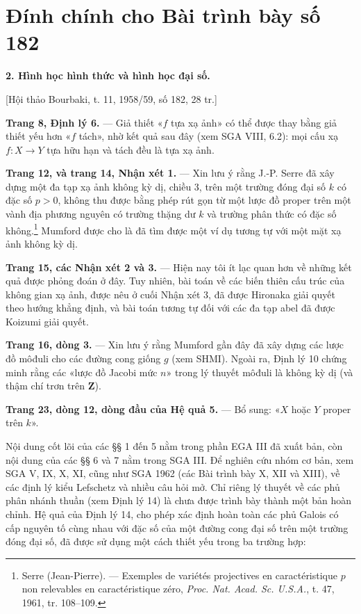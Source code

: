 \documentclass[11pt,twoside,openany]{book}
\numberwithin{equation}{section}
\newcommand{\src}[1]{%
  \phantomsection\hypertarget{src:\fgasourceid:#1}{}%
  \marginpar{\raggedleft\footnotesize\sffamily #1}%
}
\newcommand{\fgasourceid}{unset}
\newcommand{\sid}[1]{\gdef\fgasourceid{#1}\phantomsection\hypertarget{fga:#1}{}}
\begin{document}
\par

\clearpage
\chapter*{Đính chính cho Bài trình bày số 182}
\setcounter{footnote}{1}
\sid{e182}
\src{298}

\noindent\textbf{2. Hình học hình thức và hình học đại số.}

\begin{center}
[Hội thảo Bourbaki, t. 11, 1958/59, số 182, 28 tr.]
\end{center}

\noindent\textbf{Trang 8, Định lý 6.} --- Giả thiết «$f$ tựa xạ ảnh» có thể
được thay bằng giả thiết yếu hơn «$f$ tách», nhờ kết quả sau đây (xem SGA VIII,
6.2): mọi cấu xạ $f:X\longrightarrow Y$ tựa hữu hạn và tách đều là tựa xạ ảnh.

\src{299}
\noindent\textbf{Trang 12, và trang 14, Nhận xét 1.} --- Xin lưu ý rằng J.-P.
Serre đã xây dựng một đa tạp xạ ảnh không kỳ dị, chiều 3, trên một trường đóng
đại số $k$ có đặc số $p>0$, không thu được bằng phép rút gọn từ một lược đồ
proper trên một vành địa phương nguyên có trường thặng dư $k$ và trường phân
thức có đặc số không.\footnote{Serre (Jean-Pierre). --- Exemples de variétés
projectives en caractéristique $p$ non relevables en caractéristique zéro,
\emph{Proc. Nat. Acad. Sc. U.S.A.}, t. 47, 1961, tr. 108--109.} Mumford được
cho là đã tìm được một ví dụ tương tự với một mặt xạ ảnh không kỳ dị.

\noindent\textbf{Trang 15, các Nhận xét 2 và 3.} --- Hiện nay tôi ít lạc quan
hơn về những kết quả được phỏng đoán ở đây. Tuy nhiên, bài toán về các biến
thiên cấu trúc của không gian xạ ảnh, được nêu ở cuối Nhận xét 3, đã được
Hironaka giải quyết theo hướng khẳng định, và bài toán tương tự đối với các đa
tạp abel đã được Koizumi giải quyết.

\noindent\textbf{Trang 16, dòng 3.} --- Xin lưu ý rằng Mumford gần đây đã xây
dựng các lược đồ môđuli cho các đường cong giống $g$ (xem SHMI). Ngoài ra,
Định lý 10 chứng minh rằng các «lược đồ Jacobi mức $n$» trong lý thuyết môđuli
là không kỳ dị (và thậm chí trơn trên $\mathbf Z$).

\noindent\textbf{Trang 23, dòng 12, dòng đầu của Hệ quả 5.} --- Bổ sung:
«$X$ hoặc $Y$ proper trên $k$».

Nội dung cốt lõi của các §§ 1 đến 5 nằm trong phần EGA III đã xuất bản, còn
nội dung của các §§ 6 và 7 nằm trong SGA III. Để nghiên cứu nhóm cơ bản, xem
SGA V, IX, X, XI, cũng như SGA 1962 (các Bài trình bày X, XII và XIII), về các
định lý kiểu Lefschetz và nhiều câu hỏi mở. Chỉ riêng lý thuyết về các phủ phân
nhánh thuần (xem Định lý 14) là chưa được trình bày thành một bản hoàn chỉnh.
Hệ quả của Định lý 14, cho phép xác định hoàn toàn các phủ Galois có cấp nguyên
tố cùng nhau với đặc số của một đường cong đại số trên một trường đóng đại số,
đã được sử dụng một cách thiết yếu trong ba trường hợp:
\end{document}
